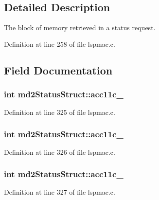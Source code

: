 \subsection{Detailed Description}
The block of memory retrieved in a status request. 

Definition at line 258 of file lspmac.\-c.



\subsection{Field Documentation}
\hypertarget{structmd2StatusStruct_a69fc2e30a5de0a11c992d133e7a761cd}{
\subsubsection[{acc11c\-\_\-1}]{\setlength{\rightskip}{0pt plus 5cm}int md2\-Status\-Struct\-::acc11c\-\_}}\label{structmd2StatusStruct_a69fc2e30a5de0a11c992d133e7a761cd}


Definition at line 325 of file lspmac.\-c.

\hypertarget{structmd2StatusStruct_ad186f06cb4670b00b8af8264d1da66a4}{
\subsubsection[{acc11c\-\_\-2}]{\setlength{\rightskip}{0pt plus 5cm}int md2\-Status\-Struct\-::acc11c\-\_}}\label{structmd2StatusStruct_ad186f06cb4670b00b8af8264d1da66a4}


Definition at line 326 of file lspmac.\-c.

\hypertarget{structmd2StatusStruct_a20a15620e12888f61c0aed1e47e97932}{
\subsubsection[{acc11c\-\_\-3}]{\setlength{\rightskip}{0pt plus 5cm}int md2\-Status\-Struct\-::acc11c\-\_}}\label{structmd2StatusStruct_a20a15620e12888f61c0aed1e47e97932}


Definition at line 327 of file lspmac.\-c.

